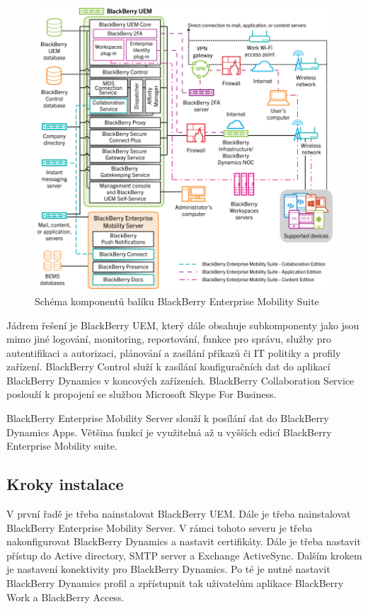 \begin{figure}[h!]
\centering
\includegraphics[width=13cm]{img/BBEMS}
\caption{Schéma komponentů balíku BlackBerry Enterprise Mobility Suite}\label{BBEMS}
\end{figure} 

Jádrem řešení je BlackBerry UEM, který dále obsahuje subkomponenty jako jsou mimo jiné logování, monitoring, reportování, funkce pro správu, služby pro autentifikaci a autorizaci, plánování a zasílání příkazů či IT politiky a profily zařízení. BlackBerry Control služí k zasílání konfiguračních dat do aplikací BlackBerry Dynamics v koncových zařízeních. BlackBerry Collaboration Service poslouží k propojení se službou Microsoft Skype For Business. 

BlackBerry Enterprise Mobility Server slouží k posílání dat do BlackBerry Dynamics Apps. Většina funkcí je využitelná až u vyšších edicí BlackBerry Enterprise Mobility suite.

\subsection{Kroky instalace}
V první řadě je třeba nainstalovat BlackBerry UEM. Dále je třeba nainstalovat BlackBerry Enterprise Mobility Server. V rámci tohoto severu je třeba nakonfigurovat BlackBerry Dynamics a nastavit certifikáty.  Dále je třeba nastavit přístup do Active directory, SMTP server a Exchange ActiveSync. Dalším krokem je nastavení konektivity pro BlackBerry Dynamics. Po té je nutné nastavit BlackBerry Dynamics profil a zpřístupnit tak uživatelům aplikace BlackBerry Work a BlackBerry Access. 

